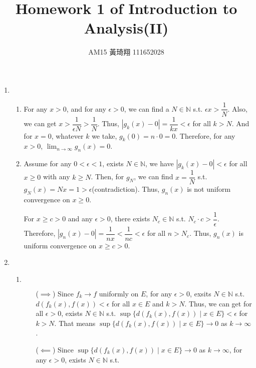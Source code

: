 \documentclass[12pt]{article}
\title{Homework 1 of Introduction to Analysis(II)}
\author{AM15 黃琦翔 111652028}
\begin{document}
\maketitle
\begin{enumerate}
    \item \begin{enumerate}
        \item For any $x > 0$, and for any $\epsilon > 0$, we can find a $N \in \mathbb{N}$ s.t. $\epsilon x > \dfrac{1}{N}$.
        Also, we can get $x > \dfrac{1}{\epsilon N} > \dfrac{1}{N}$.
        Thus, $|g_k(x) - 0| = \dfrac{1}{kx} < \epsilon$ for all $k > N$.
        And for $x = 0$, whatever $k$ we take, $g_k(0) = n \cdot 0 = 0$.
        Therefore, for any $x > 0$, $\displaystyle\lim_{n\to\infty} g_n(x) = 0$.

        \item Assume for any $0 < \epsilon < 1$, exists $N \in \mathbb{N}$,
        we have $|g_k(x) - 0| < \epsilon$ for all $x \geq 0$ with any $k \geq N$.
        Then, for $g_N$, we can find $x = \dfrac{1}{N}$ s.t. $g_N(x) = Nx = 1 > \epsilon$(contradiction).
        Thus, $g_n(x)$ is not uniform convergence on $x \geq 0$.

        For $x \geq c > 0$ and any $\epsilon > 0$, there exists $N_c \in \mathbb{N}$ s.t. $N_c \cdot c > \dfrac{1}{\epsilon}$.
        Therefore, $|g_n(x) - 0| = \dfrac{1}{nx} < \dfrac{1}{nc} < \epsilon$ for all $n > N_c$.
        Thus, $g_n(x)$ is uniform convergence on $x \geq c > 0$.
    \end{enumerate}

    \item \begin{enumerate}
        \item $\ $ \begin{enumerate}
            \item[($\implies$)] Since $f_k \to f$ uniformly on $E$, for any $\epsilon > 0$, 
            exsits $N \in \mathbb{N}$ s.t. $d(f_k(x), f(x)) < \epsilon$ for all $x\in E$ and $k > N$.
            Thus, we can get for all $\epsilon > 0$, exists $N \in \mathbb{N}$ s.t. $\sup \{ d(f_k(x), f(x)) \mid x\in E\} < \epsilon$ for $k > N$.
            That means $\sup \{ d(f_k(x), f(x)) \mid x \in E\} \to 0$ as $k\to \infty$.
        
            \item[($\impliedby$)] Since $\sup \{ d(f_k(x), f(x)) \mid x\in E\} \to 0$ as $k \to \infty$, for any $\epsilon > 0$,
            exists $N \in \mathbb{N}$ s.t.
            

\end{enumerate}
\end{enumerate}
\end{enumerate}
\end{document}
